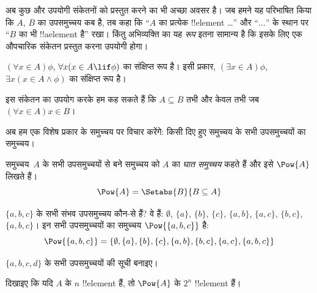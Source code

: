 \documentclass[../../../include/open-logic-section]{subfiles}
\begin{document}
अब कुछ और उपयोगी संकेतनों को प्रस्तुत करने का भी अच्छा अवसर है। जब हमने यह
परिभाषित किया कि $A$, $B$ का उपसमुच्चय कब है, तब कहा कि ``$A$ का प्रत्येक
!!{element} \dots'' और ``$\dots$'' के स्थान पर ``$B$ का भी !!a{element}
है'' रखा। किंतु अभिव्यक्ति का यह \emph{रूप} इतना सामान्य है कि इसके लिए एक
औपचारिक संकेतन प्रस्तुत करना उपयोगी होगा।

\begin{defn}
$(\forall x \in A)\phi$, $\forall x(x \in A \lif \phi)$ का संक्षिप्त रूप
है। इसी प्रकार, $(\exists x \in A)\phi$, $\exists x(x \in A \land \phi)$
का संक्षिप्त रूप है।
\end{defn}

इस संकेतन का उपयोग करके हम कह सकते हैं कि $A \subseteq B$ तभी और केवल तभी
जब $(\forall x \in A)x \in B$।

अब हम एक विशेष प्रकार के समुच्चय पर विचार करेंगे: किसी दिए हुए समुच्चय के सभी
उपसमुच्चयों का समुच्चय।

\begin{defn}[घात समुच्चय]
समुच्चय~$A$ के सभी उपसमुच्चयों से बने समुच्चय को $A$ का \emph{घात समुच्चय}
कहते हैं और इसे $\Pow{A}$ लिखते हैं।
  \[
    \Pow{A} = \Setabs{B}{B \subseteq A}
  \]
\end{defn}

\begin{ex}
$\{ a, b, c \}$ के सभी संभव उपसमुच्चय कौन-से हैं? वे हैं:
$\emptyset$, $\{a \}$, $\{b\}$, $\{c\}$, $\{a, b\}$, $\{a, c\}$,
$\{b, c\}$, $\{a, b, c\}$। इन सभी उपसमुच्चयों का समुच्चय
$\Pow{\{a,b,c\}}$ है:
\[
\Pow{\{ a, b, c \}} = \{\emptyset, \{a \}, \{b\}, \{c\}, \{a, b\},
\{b, c\}, \{a, c\}, \{a, b, c\}\}
\]
\end{ex}

\begin{prob}
$\{a, b, c, d\}$ के सभी उपसमुच्चयों की सूची बनाइए।
\end{prob}

\begin{prob}
दिखाइए कि यदि $A$ के $n$ !!{element} हैं, तो $\Pow{A}$ के $2^n$
!!{element} हैं।
\end{prob}
\end{document}
